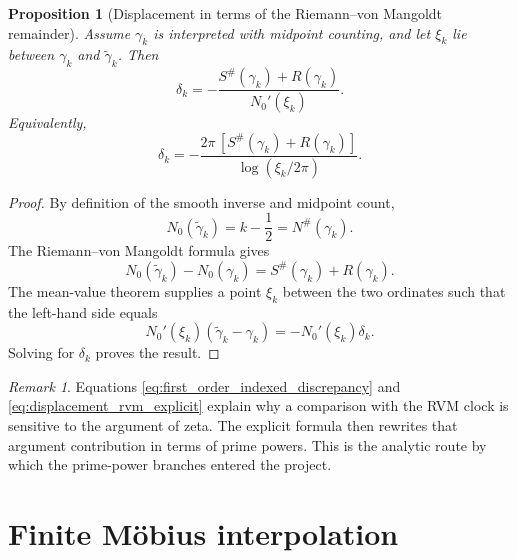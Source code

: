 \documentclass[11pt]{amsart}
\numberwithin{equation}{section}
\theoremstyle{plain}
\newtheorem{proposition}[theorem]{Proposition}
\theoremstyle{definition}
\theoremstyle{remark}
\newtheorem{remark}[theorem]{Remark}
\newcommand{\1}{\mathbf{1}}
\begin{document}
\begin{proposition}[Displacement in terms of the Riemann--von Mangoldt remainder]
\label{prop:displacement_rvm_remainder}
Assume \(\gamma_k\) is interpreted with midpoint counting, and let
\(\xi_k\) lie between \(\gamma_k\) and \(\widetilde\gamma_k\).  Then
\begin{equation}
\boxed{
\delta_k
=
-
\frac{S^{\#}(\gamma_k)+R(\gamma_k)}
{N_0'(\xi_k)}.
}
\label{eq:displacement_rvm_formula}
\end{equation}
Equivalently,
\begin{equation}
\delta_k
=
-
\frac{2\pi\,[S^{\#}(\gamma_k)+R(\gamma_k)]}
{\log(\xi_k/2\pi)}.
\label{eq:displacement_rvm_explicit}
\end{equation}
\end{proposition}

\begin{proof}
By definition of the smooth inverse and midpoint count,
\begin{equation}
N_0(\widetilde\gamma_k)
=
k-\frac12
=
N^{\#}(\gamma_k).
\label{eq:displacement_count_equalities}
\end{equation}
The Riemann--von Mangoldt formula gives
\begin{equation}
N_0(\widetilde\gamma_k)-N_0(\gamma_k)
=
S^{\#}(\gamma_k)+R(\gamma_k).
\label{eq:displacement_count_difference}
\end{equation}
The mean-value theorem supplies a point \(\xi_k\) between the two
ordinates such that the left-hand side equals
\begin{equation}
N_0'(\xi_k)(\widetilde\gamma_k-\gamma_k)
=
-N_0'(\xi_k)\delta_k.
\label{eq:displacement_mvt}
\end{equation}
Solving for \(\delta_k\) proves the result.
\end{proof}

\begin{remark}
\label{rem:rvm_origin_prime_formula}
Equations \eqref{eq:first_order_indexed_discrepancy} and
\eqref{eq:displacement_rvm_explicit} explain why a comparison with the RVM
clock is sensitive to the argument of zeta.  The explicit formula then
rewrites that argument contribution in terms of prime powers.  This is the
analytic route by which the prime-power branches entered the project.
\end{remark}

\part{Finite Möbius interpolation}
\end{document}

